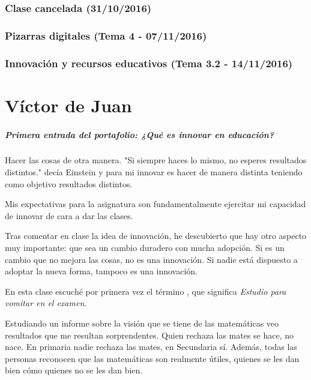 \documentclass[palatino,nochap,miniheader]{apuntesURJC}
\begin{document}
\subsection{Clase cancelada (31/10/2016)}

\subsection{Pizarras digitales (Tema 4 - 07/11/2016)}


\subsection{Innovación y recursos educativos (Tema 3.2 - 14/11/2016)}



\chapter{Víctor de Juan}


\paragraph{Primera entrada del portafolio: ¿Qué es innovar en educación?}

Hacer las cosas de otra manera. "Si siempre haces lo mismo, no esperes resultados distintos." decía Einstein y para mi innovar es hacer de manera distinta teniendo como objetivo resultados distintos.

Mis expectativas para la asignatura son fundamentalmente ejercitar mi capacidad de innovar de cara a dar las clases. 

Tras comentar en clase la idea de innovación, he descubierto que hay otro aspecto muy importante: que sea un cambio duradero con mucha adopción.
%
Si es un cambio que no mejora las cosas, no es una innovación. 
%
Si nadie está dispuesto a adoptar la nueva forma, tampoco es una innovación.

En esta clase escuché por primera vez el término , que significa \textit{Estudio para vomitar en el examen}.



Estudiando un informe sobre la visión que se tiene de las matemáticas veo resultados que me resultan sorprendentes. 
%
Quien rechaza las mates se hace, no nace. En primaria nadie rechaza las mates, en Secundaria sí.
%
Además, todas las personas reconocen que las matemáticas son realmente útiles, quienes se les dan bien cómo quienes no se les dan bien.
\end{document}
